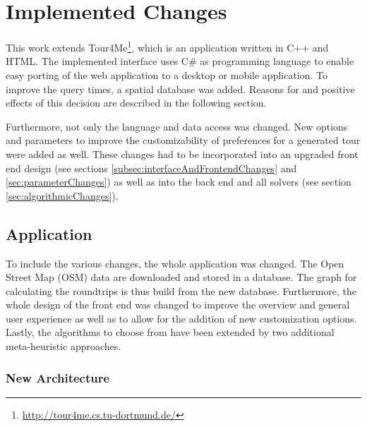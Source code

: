 \chapter{Implemented Changes}
\label{chapter:implementedChanges}

This work extends Tour4Me\footnote{\url{http://tour4me.cs.tu-dortmund.de/}}, which is an application written in C++ and HTML. 
The implemented interface uses C\# as programming language to enable easy porting of the web application to a desktop or mobile application.
To improve the query times, a spatial database was added. 
Reasons for and positive effects of this decision are described in the following section.

Furthermore, not only the language and data access was changed.
New options and parameters to improve the customizability of preferences for a generated tour were added as well.
These changes had to be incorporated into an upgraded front end design (see sections \ref{subsec:interfaceAndFrontendChanges} and \ref{sec:parameterChanges}) as well as into the back end and all solvers (see section \ref{sec:algorithmicChanges}). 


\section{Application}
\label{sec:application}

To include the various changes, the whole application was changed.
The Open Street Map (OSM) data are downloaded and stored in a database.
The graph for calculating the roundtrips is thus build from the new database.
Furthermore, the whole design of the front end was changed to improve the overview and general user experience as well as to allow for the addition of new customization options.
Lastly, the algorithms to choose from have been extended by two additional meta-heuristic approaches.

\subsection{New Architecture}
\label{sec:newArchitecture}

